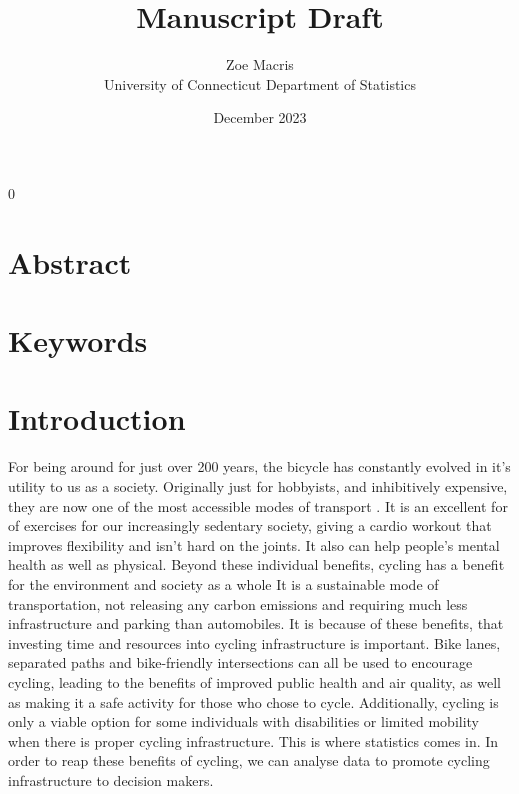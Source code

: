\documentclass[12pt, letterpaper]{article}
\newcommand{\blind}{0}
\begin{document}

\blind
{
  \title{\bf Manuscript Draft}
  \author{Zoe Macris\\
  University of Connecticut Department of Statistics
\date{December 2023}
  \maketitle} 


\section{Abstract}
\label{sec:abstract}



\section{Keywords}
\label{sec:keywords}


\section{Introduction}
\label{sec:intro}

For being around for just over 200 years, the bicycle has constantly evolved in it's utility to us as a society. Originally just for hobbyists, and inhibitively expensive, they are now one of the most accessible modes of transport \cite{BIKE2023}. It is an excellent for of exercises for our increasingly sedentary society, giving a cardio workout that improves flexibility and isn't hard on the joints. It also can help people's mental health as well as physical. Beyond these individual benefits, cycling has a benefit for the environment and society as a whole It is a sustainable mode of transportation, not releasing any carbon emissions and requiring much less infrastructure and parking than automobiles. It is because of these benefits, that investing time and resources into cycling infrastructure is important. Bike lanes, separated paths and bike-friendly intersections can all be used to encourage cycling, leading to the benefits of improved public health and air quality, as well as making it a safe activity for those who chose to cycle. Additionally, cycling is only a viable option for some individuals with disabilities or limited mobility when there is proper cycling infrastructure. This is where statistics comes in. In order to reap these benefits of cycling, we can analyse data to promote cycling infrastructure to decision makers.

}
\end{document}
